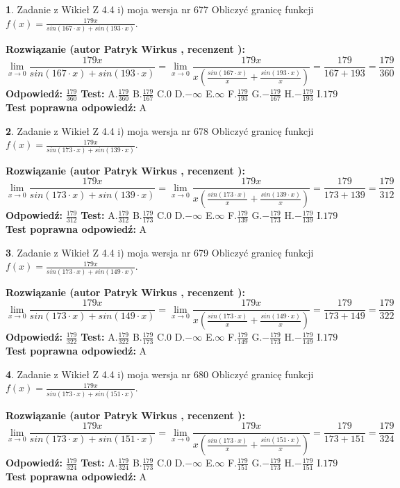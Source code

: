 \documentclass[12pt, a4paper]{article}
\theoremstyle{definition} %
\newtheorem{zad}{}
\newcommand{\zadStart}[1]{\begin{zad}#1\newline}
\newcommand{\zadStop}{\end{zad}}
\newcommand{\rozwStart}[2]{\noindent \textbf{Rozwiązanie (autor #1 , recenzent #2): }\newline}
\newcommand{\rozwStop}{\newline}
\newcommand{\odpStart}{\noindent \textbf{Odpowiedź:}\newline}
\newcommand{\odpStop}{\newline}
\newcommand{\testStart}{\noindent \textbf{Test:}\newline}
\newcommand{\testStop}{\newline}
\newcommand{\kluczStart}{\noindent \textbf{Test poprawna odpowiedź:}\newline}
\newcommand{\kluczStop}{\newline}
\begin{document}
\zadStart{Zadanie z Wikieł Z 4.4 i) moja wersja nr 677}
Obliczyć granicę funkcji $f(x)=\frac{179x}{sin(167\cdot x) +sin(193\cdot x)}$.
\zadStop
\rozwStart{Patryk Wirkus}{}
$$\lim\limits_{x\to 0}\frac{179x}{sin(167\cdot x) +sin(193\cdot x)}=\lim\limits_{x\to 0}\frac{179x}{x(\frac{sin(167\cdot x)}{x}+\frac{sin(193\cdot x)}{x})}=\frac{179}{167+193} = \frac{179}{360}$$
\rozwStop
\odpStart
$\frac{179}{360}$
\odpStop
\testStart
A.$\frac{179}{360}$
B.$\frac{179}{167}$
C.$0$
D.$-\infty$
E.$\infty$
F.$\frac{179}{193}$
G.$-\frac{179}{167}$
H.$-\frac{179}{193}$
I.$179$
\testStop
\kluczStart
A
\kluczStop



\zadStart{Zadanie z Wikieł Z 4.4 i) moja wersja nr 678}
Obliczyć granicę funkcji $f(x)=\frac{179x}{sin(173\cdot x) +sin(139\cdot x)}$.
\zadStop
\rozwStart{Patryk Wirkus}{}
$$\lim\limits_{x\to 0}\frac{179x}{sin(173\cdot x) +sin(139\cdot x)}=\lim\limits_{x\to 0}\frac{179x}{x(\frac{sin(173\cdot x)}{x}+\frac{sin(139\cdot x)}{x})}=\frac{179}{173+139} = \frac{179}{312}$$
\rozwStop
\odpStart
$\frac{179}{312}$
\odpStop
\testStart
A.$\frac{179}{312}$
B.$\frac{179}{173}$
C.$0$
D.$-\infty$
E.$\infty$
F.$\frac{179}{139}$
G.$-\frac{179}{173}$
H.$-\frac{179}{139}$
I.$179$
\testStop
\kluczStart
A
\kluczStop



\zadStart{Zadanie z Wikieł Z 4.4 i) moja wersja nr 679}
Obliczyć granicę funkcji $f(x)=\frac{179x}{sin(173\cdot x) +sin(149\cdot x)}$.
\zadStop
\rozwStart{Patryk Wirkus}{}
$$\lim\limits_{x\to 0}\frac{179x}{sin(173\cdot x) +sin(149\cdot x)}=\lim\limits_{x\to 0}\frac{179x}{x(\frac{sin(173\cdot x)}{x}+\frac{sin(149\cdot x)}{x})}=\frac{179}{173+149} = \frac{179}{322}$$
\rozwStop
\odpStart
$\frac{179}{322}$
\odpStop
\testStart
A.$\frac{179}{322}$
B.$\frac{179}{173}$
C.$0$
D.$-\infty$
E.$\infty$
F.$\frac{179}{149}$
G.$-\frac{179}{173}$
H.$-\frac{179}{149}$
I.$179$
\testStop
\kluczStart
A
\kluczStop



\zadStart{Zadanie z Wikieł Z 4.4 i) moja wersja nr 680}
Obliczyć granicę funkcji $f(x)=\frac{179x}{sin(173\cdot x) +sin(151\cdot x)}$.
\zadStop
\rozwStart{Patryk Wirkus}{}
$$\lim\limits_{x\to 0}\frac{179x}{sin(173\cdot x) +sin(151\cdot x)}=\lim\limits_{x\to 0}\frac{179x}{x(\frac{sin(173\cdot x)}{x}+\frac{sin(151\cdot x)}{x})}=\frac{179}{173+151} = \frac{179}{324}$$
\rozwStop
\odpStart
$\frac{179}{324}$
\odpStop
\testStart
A.$\frac{179}{324}$
B.$\frac{179}{173}$
C.$0$
D.$-\infty$
E.$\infty$
F.$\frac{179}{151}$
G.$-\frac{179}{173}$
H.$-\frac{179}{151}$
I.$179$
\testStop
\kluczStart
A
\kluczStop
\end{document}
